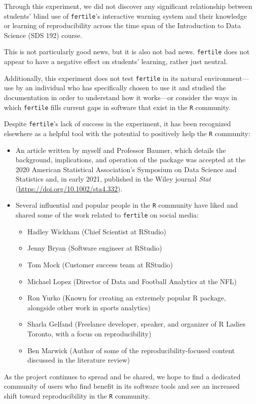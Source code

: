 \documentclass[12pt,twoside]{reedthesis}
\providecommand{\tightlist}{%
  \setlength{\itemsep}{0pt}\setlength{\parskip}{0pt}}
\begin{document}
Through this experiment, we did not discover any significant relationship between students' blind use of \texttt{fertile}'s interactive warning system and their knowledge or learning of reproducibility across the time span of the Introduction to Data Science (SDS 192) course.

This is not particularly good news, but it is also not bad news. \texttt{fertile} does not appear to have a negative effect on students' learning, rather just neutral.

Additionally, this experiment does not test \texttt{fertile} in its natural environment---use by an individual who has specifically chosen to use it and studied the documentation in order to understand how it works---or consider the ways in which \texttt{fertile} fills current gaps in software that exist in the \texttt{R} community.

Despite \texttt{fertile}'s lack of success in the experiment, it has been recognized elsewhere as a helpful tool with the potential to positively help the \texttt{R} community:
\begin{itemize}
\item
  An article written by myself and Professor Baumer, which details the background, implications, and operation of the package was accepted at the 2020 American Statistical Association's Symposium on Data Science and Statistics and, in early 2021, published in the Wiley journal \emph{Stat} (\url{https://doi.org/10.1002/sta4.332}).
\item
  Several influential and popular people in the \texttt{R} community have liked and shared some of the work related to \texttt{fertile} on social media:
  \begin{itemize}
  \tightlist
  \item
    Hadley Wickham (Chief Scientist at RStudio)
  \item
    Jenny Bryan (Software engineer at RStudio)
  \item
    Tom Mock (Customer success team at RStudio)
  \item
    Michael Lopez (Director of Data and Football Analytics at the NFL)
  \item
    Ron Yurko (Known for creating an extremely popular R package, alongside other work in sports analytics)
  \item
    Sharla Gelfand (Freelance developer, speaker, and organizer of R Ladies Toronto, with a focus on reproducibility)
  \item
    Ben Marwick (Author of some of the reproducibility-focused content discussed in the literature review)
  \end{itemize}
\end{itemize}
As the project continues to spread and be shared, we hope to find a dedicated community of users who find benefit in its software tools and see an increased shift toward reproducibility in the \texttt{R} community.
\end{document}
